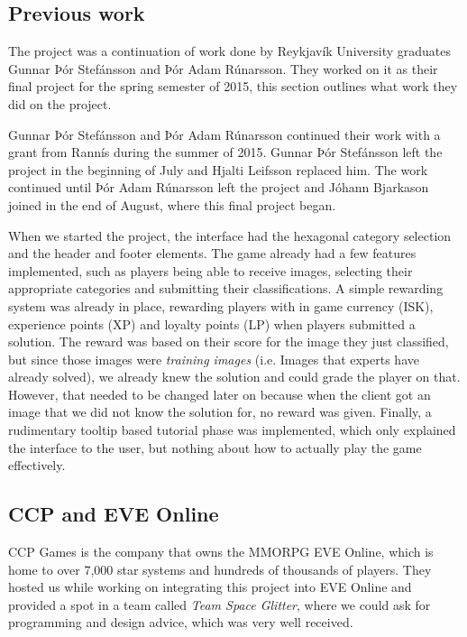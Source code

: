 
\subsection{Previous work}
	The project was a continuation of work done by Reykjavík University graduates Gunnar Þór Stefánsson and Þór Adam Rúnarsson. They worked on it as their final project for the spring semester of 2015, this section outlines what work they did on the project. 

	Gunnar Þór Stefánsson and Þór Adam Rúnarsson continued their work with a grant from Rannís during the summer of 2015. Gunnar Þór Stefánsson left the project in the beginning of July and Hjalti Leifsson replaced him. The work continued until Þór Adam Rúnarsson left the project and Jóhann Bjarkason joined in the end of August, where this final project began.

	When we started the project, the interface had the hexagonal category selection and the header and footer elements. The game already had a few features implemented, such as players being able to receive images, selecting their appropriate categories and submitting their classifications.
	A simple rewarding system was already in place, rewarding players with in game currency (ISK), experience points (XP) and loyalty points (LP) when players submitted a solution. The reward was based on their score for the image they just classified, but since those images were \emph{training images} (i.e. Images that experts have already solved), we already knew the solution and could grade the player on that. However, that needed to be changed later on because when the client got an image that we did not know the solution for, no reward was given.
	Finally, a rudimentary tooltip based tutorial phase was implemented, which only explained the interface to the user, but nothing about how to actually play the game effectively.

\subsection{CCP and EVE Online}
	CCP Games is the company that owns the MMORPG EVE Online, which is home to over 7,000 star systems and hundreds of thousands of players. They hosted us while working on integrating this project into EVE Online and provided a spot in a team called \emph{Team Space Glitter}, where we could ask for programming and design advice, which was very well received.

